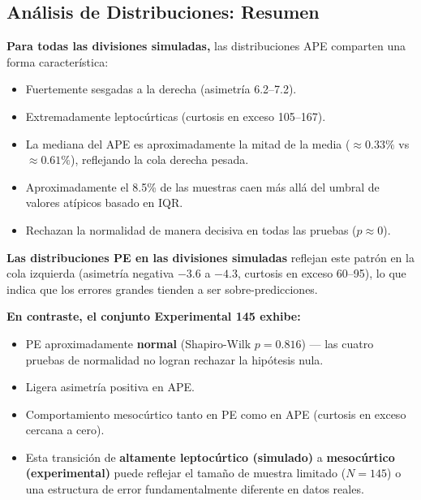 \documentclass{article}
\begin{document}
\subsection{Análisis de Distribuciones: Resumen}

\textbf{Para todas las divisiones simuladas,} las distribuciones APE comparten una forma característica:
\begin{itemize}
\item Fuertemente sesgadas a la derecha (asimetría 6.2--7.2).
\item Extremadamente leptocúrticas (curtosis en exceso 105--167).
\item La mediana del APE es aproximadamente la mitad de la media ($\approx 0.33\%$ vs $\approx 0.61\%$), reflejando la cola derecha pesada.
\item Aproximadamente el 8.5\% de las muestras caen más allá del umbral de valores atípicos basado en IQR.
\item Rechazan la normalidad de manera decisiva en todas las pruebas ($p \approx 0$).
\end{itemize}

\textbf{Las distribuciones PE en las divisiones simuladas} reflejan este patrón en la cola izquierda (asimetría negativa $-3.6$ a $-4.3$, curtosis en exceso 60--95), lo que indica que los errores grandes tienden a ser sobre-predicciones.

\textbf{En contraste, el conjunto Experimental 145 exhibe:}
\begin{itemize}
\item PE aproximadamente \textbf{normal} (Shapiro-Wilk $p = 0.816$) — las cuatro pruebas de normalidad no logran rechazar la hipótesis nula.
\item Ligera asimetría positiva en APE.
\item Comportamiento mesocúrtico tanto en PE como en APE (curtosis en exceso cercana a cero).
\item Esta transición de \textbf{altamente leptocúrtico (simulado)} a \textbf{mesocúrtico (experimental)} puede reflejar el tamaño de muestra limitado ($N = 145$) o una estructura de error fundamentalmente diferente en datos reales.
\end{itemize}
\end{document}
